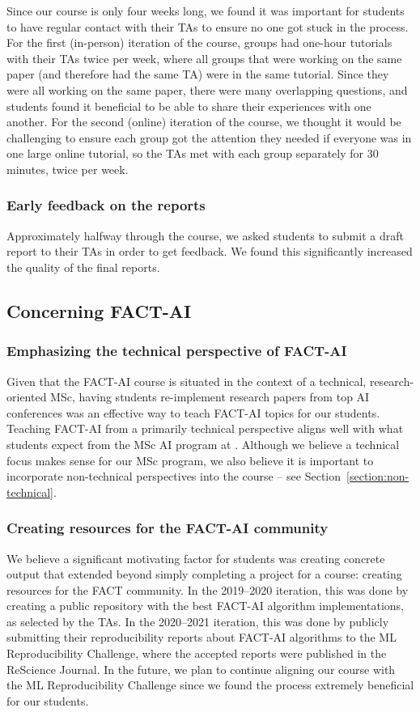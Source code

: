 Since our course is only four weeks long, we found it was important for students to have regular contact with their TAs to ensure no one got stuck in the process. 
For the first (in-person) iteration of the course, groups had one-hour tutorials with their TAs twice per week, where all groups that were working on the same paper (and therefore had the same TA) were in the same tutorial. 
Since they were all working on the same paper, there were many overlapping questions, and students found it beneficial to be able to share their experiences with one another. 
For the second (online) iteration of the course, we thought it would be challenging to ensure each group got the attention they needed if everyone was in one large online tutorial, so the TAs met with each group separately for 30 minutes, twice per week. 

\subsubsection{Early feedback on the reports}
Approximately halfway through the course, we asked students to submit a draft report to their TAs in order to get feedback. We found this significantly increased the quality of the final reports. 

\subsection{Concerning FACT-AI}

\subsubsection{Emphasizing the technical perspective of FACT-AI}
Given that the FACT-AI course is situated in the context of a technical, research-oriented MSc, having students re-implement research papers from top AI conferences was an effective way to teach FACT-AI topics for our students. 
Teaching FACT-AI from a primarily technical perspective 
aligns well with what students expect from the MSc AI program at \OurUniversity{}.
Although we believe a technical focus makes sense for our MSc program, we also believe it is important to incorporate non-technical perspectives into the course -- see Section~\ref{section:non-technical}. 

\subsubsection{Creating resources for the FACT-AI community}
We believe a significant motivating factor for students was creating concrete output that extended beyond simply completing a project for a course: creating resources for the FACT community. 
In the 2019--2020 iteration, this was done by creating a public repository with the best FACT-AI algorithm implementations, as selected by the TAs. 
In the 2020--2021 iteration, this was done by publicly submitting their reproducibility reports about FACT-AI algorithms to the ML Reproducibility Challenge, where the accepted reports were published in the ReScience Journal. 
In the future, we plan to continue aligning our course with the ML Reproducibility Challenge since we found the process extremely beneficial for our students. 

